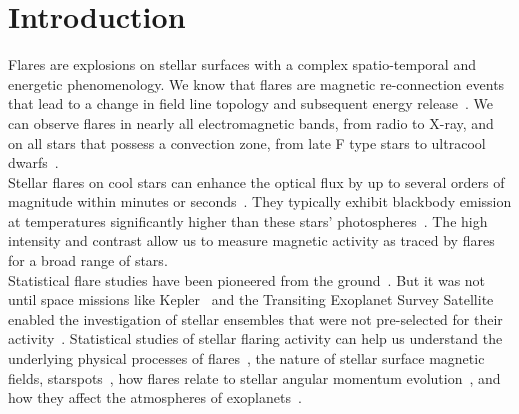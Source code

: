 \documentclass{aa}
\begin{document}
\section{Introduction}
Flares are explosions on stellar surfaces with a complex spatio-temporal and energetic phenomenology. We know that flares are magnetic re-connection events that lead to a change in field line topology and subsequent energy release~\citep{priest_magnetic_2002}. We can observe flares in nearly all electromagnetic bands, from radio
to X-ray, and on all stars that possess a convection zone, from late F type stars to ultracool dwarfs~\citep{schaefer2000,benz2010,gizis2013}. 
\\
Stellar flares on cool stars can enhance the optical flux by up to several orders of magnitude within minutes or seconds~\citep{haisch1991}. They typically exhibit blackbody emission at temperatures significantly higher than these stars' photospheres~\citep{hawley1992}. The high intensity and contrast allow us to measure magnetic activity as traced by flares for a broad range of stars.
\\
Statistical flare studies have been pioneered from the ground~\citep{lacy_uv_1976}. But it was not until space missions like Kepler~\citep{koch2010} and the Transiting Exoplanet Survey Satellite~\citep{ricker2014} enabled the investigation of stellar ensembles that were not pre-selected for their activity~\citep{walkowicz2011}. Statistical studies of stellar flaring activity can help us understand the underlying physical processes of flares~\citep{benz2010}, the nature of stellar surface magnetic fields, starspots~\citep{davenport_flaresandspots_2015, howard2020}, how flares relate to stellar angular momentum evolution~\citep{mondrik2019, howard2020}, and how they affect the atmospheres of exoplanets~\citep{lecavelier_flareescape_2012, loyd_mflaresplanetsfuv_2018, tilley_repeated_flare_2019, howard2019}.%
\end{document}
